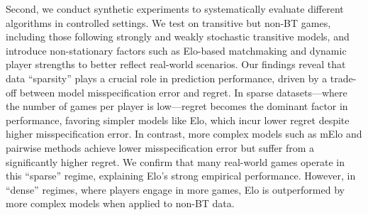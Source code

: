 Second, we conduct synthetic experiments to systematically evaluate different algorithms in controlled settings. We test on transitive but non-BT games, including those following strongly and weakly stochastic transitive models, and introduce non-stationary factors such as Elo-based matchmaking and dynamic player strengths to better reflect real-world scenarios. Our findings reveal that data ``sparsity'' plays a crucial role in prediction performance, driven by a trade-off between model misspecification error and regret. In sparse datasets---where the number of games per player is low---regret becomes the dominant factor in performance, favoring simpler models like Elo, which incur lower regret despite higher misspecification error. In contrast, more complex models such as mElo and pairwise methods achieve lower misspecification error but suffer from a significantly higher regret. We confirm that many real-world games operate in this ``sparse'' regime, explaining Elo’s strong empirical performance. However, in ``dense'' regimes, where players engage in more games, Elo is outperformed by more complex models when applied to non-BT data.




